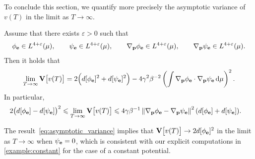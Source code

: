 \documentclass[11pt,a4paper]{article}
\begin{document}
To conclude this section,
we quantify more precisely the asymptotic variance of $v(T)$ in the limit as $T \to \infty$.
\begin{proposition}
    \label{proposition:asymptotic_variance}
    Assume that there exists $\varepsilon > 0$ such that
    \begin{equation}
        \label{eq:regularity_solution}
        \phi_{\boldsymbol{\mathbf e}} \in L^{4+\varepsilon}(\mu),
        \qquad
        \psi_{\boldsymbol{\mathbf e}} \in L^{4+\varepsilon}(\mu),
        \qquad
        \nabla_{\boldsymbol{\mathbf p}} \phi_{\boldsymbol{\mathbf e}} \in L^{4+\varepsilon}(\mu),
        \qquad
        \nabla_{\boldsymbol{\mathbf p}} \psi_{\boldsymbol{\mathbf e}} \in L^{4+\varepsilon}(\mu).
    \end{equation}
    Then it holds that
    \begin{equation}
        \label{eq:asymptotic_variance}
        \lim_{T \to \infty} \mathbf{V}\bigl[v(T)\bigr] =
        2 \Bigl( d[\phi_{\boldsymbol{\mathbf e}}]^2 +  d[\psi_{\boldsymbol{\mathbf e}}]^2 \Bigr) - 4 \gamma^2 \beta^{-2} \left( \int \nabla_{\boldsymbol{\mathbf p}} \phi_{\boldsymbol{\mathbf e}} \cdot \nabla_{\boldsymbol{\mathbf p}} \psi_{\boldsymbol{\mathbf e}} \, \mathrm d \mu \right)^2.
    \end{equation}
    In particular,
    \begin{align}
        \label{eq:bounds_asymptotic_variance}
        2\bigl( d[\phi_{\vect e}] - d[\psi_{\vect e}] \bigr)^2
        \leq \lim_{T \to \infty} \var \bigl[v(T)\bigr]
        &\leq 4 \gamma \beta^{-1} \norm{\grad_{\vect p} \phi_{\vect e} - \grad_{\vect p} \psi_{\vect e}}^2 (d[\phi_{\vect e}] + d[\psi_{\vect e}]).
    \end{align}
\end{proposition}
\begin{remark}
    \label{remark:asym_variance_u}
    The result~\eqref{eq:asymptotic_variance} implies that $\mathbf{V}\bigl[v(T)\bigr] \to 2 d[\phi_{\boldsymbol{\mathbf e}}]^2$ in the limit as $T \to \infty$ when $\psi_{\boldsymbol{\mathbf e}} = 0$,
    which is consistent with our explicit computations in \cref{example:constant} for the case of a constant potential.
\end{remark}
\end{document}
